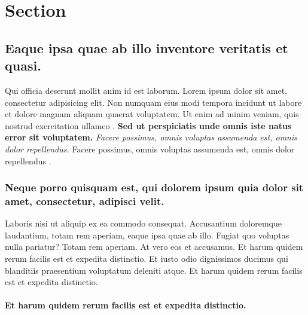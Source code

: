\label{chapter-1}

\hypertarget{section-1.1}{%
\section{Section}\label{section-1.1}}

\hypertarget{eaque-ipsa-quae-ab-illo-inventore-veritatis-et-quasi.}{%
\subsection{Eaque ipsa quae ab illo inventore veritatis et
quasi.}\label{eaque-ipsa-quae-ab-illo-inventore-veritatis-et-quasi.}}

Qui officia deserunt mollit anim id est laborum. Lorem ipsum dolor sit
amet, consectetur adipisicing elit. Non numquam eius modi tempora
incidunt ut labore et dolore magnam aliquam quaerat voluptatem. Ut enim
ad minim veniam, quis nostrud exercitation ullamco
\citep{Zongkerchicken2005}. \textbf{Sed ut perspiciatis unde omnis iste
natus error sit voluptatem.} \emph{Facere possimus, omnis voluptas
assumenda est, omnis dolor repellendus.} Facere possimus, omnis voluptas
assumenda est, omnis dolor repellendus \citep{upper1974unsuccessful}.



\hypertarget{neque-porro-quisquam-est-qui-dolorem-ipsum-quia-dolor-sit-amet-consectetur-adipisci-velit.}{%
\subsubsection{Neque porro quisquam est, qui dolorem ipsum quia dolor
sit amet, consectetur, adipisci
velit.}\label{neque-porro-quisquam-est-qui-dolorem-ipsum-quia-dolor-sit-amet-consectetur-adipisci-velit.}}

Laboris nisi ut aliquip ex ea commodo consequat. Accusantium doloremque
laudantium, totam rem aperiam, eaque ipsa quae ab illo. Fugiat quo
voluptas nulla pariatur? Totam rem aperiam. At vero eos et accusamus. Et
harum quidem rerum facilis est et expedita distinctio. Et iusto odio
dignissimos ducimus qui blanditiis praesentium voluptatum deleniti
atque. Et harum quidem rerum facilis est et expedita distinctio.

\hypertarget{et-harum-quidem-rerum-facilis-est-et-expedita-distinctio.}{%
\paragraph{\texorpdfstring{Et harum quidem rerum facilis est et expedita
distinctio.\newline}{Et harum quidem rerum facilis est et expedita distinctio.}}\label{et-harum-quidem-rerum-facilis-est-et-expedita-distinctio.}}

